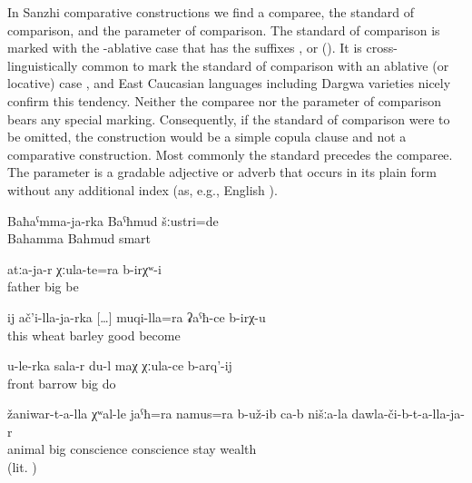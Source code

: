 In Sanzhi comparative constructions we find a comparee, the standard of comparison, and the parameter of comparison. The standard of comparison is marked with the -ablative case that has the suffixes ,  or  (). It is cross-linguistically common to mark the standard of comparison with an ablative (or locative) case \citep[791]{Dixon2008}, and East Caucasian languages including Dargwa varieties nicely confirm this tendency. Neither the comparee nor the parameter of comparison bears any special marking. Consequently, if the standard of comparison were to be omitted, the construction would be a simple copula clause and not a comparative construction. Most commonly the standard precedes the comparee. The parameter is a gradable adjective or adverb that occurs in its plain form without any additional index (as, e.g., English ).
%
\begin{exe}
	\ex	\label{ex:‎Bahmud was smarter than Bahamma}
	\gll	Baħaˁmma-ja-rka	Baˁħmud	šːustri=de	\\
		Bahamma	Bahmud	smart\\
	\glt	{}

	\ex	\label{ex:‎‎There were those older than father}
	\gll	atːa-ja-r	χːula-te=ra	b-irχʷ-i\\
		father	big be\\
	\glt	{}

	\ex	\label{ex:‎‎It (bread) is better (when made) of barley than of wheat.}
	\gll	ij	ač'i-lla-ja-rka	[\ldots]	muqi-lla=ra	ʡaˁħ-ce	b-irχ-u	\\
		this	wheat	{} barley	good	become\\
	\glt	{}

	\ex	\label{ex:‎I (will) make a big barrow (maχ) earlier than you}
	\gll	u-le-rka	sala-r	du-l	maχ	χːula-ce	b-arq'-ij\\
			front		barrow	big	do	\\
	\glt	{}

	\ex	\label{ex:‎‎‎The animals had apparently more conscience than our rich (people)}
	\gll	žaniwar-t-a-lla	χʷal-le	jaˁħ=ra		namus=ra	b-už-ib	ca-b	nišːa-la	dawla-či-b-t-a-lla-ja-r	\\
		animal	big	conscience	conscience	stay			wealth\\
	\glt	{} (lit. )
\end{exe}

